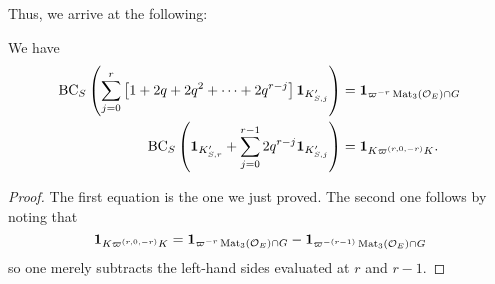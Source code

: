 Thus, we arrive at the following:
\begin{proposition}
  We have
  \begin{align*}
    \operatorname{BC}_S \left( \sum_{j=0}^r \left[ 1 + 2q + 2q^2 + \dots + 2q^{r-j} \right]
    \mathbf{1}_{K'_{S,j}} \right)
    &= \mathbf{1}_{\varpi^{-r} \operatorname{Mat}_3(\mathcal O_E) \cap G} \\
    \operatorname{BC}_S \left( \mathbf{1}_{K'_{S,r}}
    + \sum_{j=0}^{r-1} 2q^{r-j} \mathbf{1}_{K'_{S,j}} \right)
    &= \mathbf{1}_{K\varpi^{(r,0,-r)}K}.
  \end{align*}
\end{proposition}
\begin{proof}
  The first equation is the one we just proved.
  The second one follows by noting that
  \[
    \mathbf{1}_{K\varpi^{(r,0,-r)}K}
    = \mathbf{1}_{\varpi^{-r} \operatorname{Mat}_3(\mathcal O_E) \cap G}
    - \mathbf{1}_{\varpi^{-(r-1)} \operatorname{Mat}_3(\mathcal O_E) \cap G}
  \]
  so one merely subtracts the left-hand sides evaluated at $r$ and $r-1$.
\end{proof}
